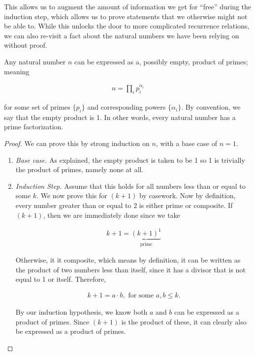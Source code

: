 This allows us to augment the amount of information we get for ``free'' during the induction step, which allows us to prove statements that we otherwise might not be able to. While this unlocks the door to more complicated recurrence relations, we can also re-visit a fact about the natural numbers we have been relying on without proof.

\vspace{\baselineskip}
\begin{theorem}
	Any natural number $n$ can be expressed as a, possibly empty, product of primes; meaning
	
	\begin{align*}
		n = \prod_{i} p_i^{\alpha_i}
	\end{align*}
	
	for some set of primes $\{ p_i \}$ and corresponding powers $\{ \alpha_i \}$. By convention, we say that the empty product is 1. In other words, every natural number has a prime factorization.
\end{theorem}
\begin{proof}
	We can prove this by strong induction on $n$, with a base case of $n = 1$.
	
	\vspace{\baselineskip}
	\begin{enumerate}
		\item \emph{Base case.} As explained, the empty product is taken to be 1 so 1 is trivially the product of primes, namely none at all.
		
		\item \emph{Induction Step.} Assume that this holds for all numbers less than or equal to some $k$. We now prove this for $(k + 1)$ by casework. Now by definition, every number greater than or equal to 2 is either prime or composite. If $(k + 1)$, then we are immediately done since we take
		
		\begin{align*}
			k + 1 = \underbrace{(k + 1)^1}_\text{prime}
		\end{align*}
		
		Otherwise, it it composite, which means by definition, it can be written as the product of two numbers less than itself, since it has a divisor that is not equal to 1 or itself. Therefore,
		
		\begin{align*}
			k + 1 = a \cdot b, \text{ for some } a, b \le k.
		\end{align*}
		
		By our induction hypothesis, we know both $a$ and $b$ can be expressed as a product of primes. Since $(k + 1)$ is the product of these, it can clearly also be expressed as a product of primes.
	\end{enumerate}
\end{proof}
\vspace{\baselineskip}

